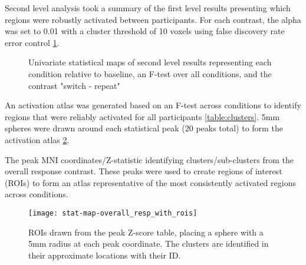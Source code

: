 \documentclass[10pt,letterpaper]{article}
\begin{document}
Second level analysis took a summary of the first level results presenting which
regions were robustly activated between participants.
For each contrast, the alpha was set to 0.01 with a cluster threshold of 10 voxels using
false discovery rate error control \ref{fig:stat_maps}.

\begin{figure}[H]
  \centering
\end{figure}

\begin{figure}[H]
  \ContinuedFloat
  \centering
\end{figure}

\begin{figure}[H]
  \ContinuedFloat
  \centering
\end{figure}

\begin{figure}[H]
  \ContinuedFloat
  \centering
  \caption{
    Univariate statistical maps of second level results representing
    each condition relative to baseline, an F-test over all conditions,
    and the contrast "switch - repeat"}
  \label{fig:stat_maps}
\end{figure}

An activation atlas was generated based on an F-test across conditions
to identify regions that were reliably activated for all participants \ref{table:clusters}.
5mm spheres were drawn around each statistical peak (20 peaks total)
to form the activation atlas \ref{fig:methroimap}.

\begin{table}[H]
  \caption{
    The peak MNI coordinates/Z-statistic identifying clusters/sub-clusters from the overall
    response contrast.
    These peaks were used to create regions of interest (ROIs) to form an atlas representative
    of the most consistently activated regions across conditions.
  }
  \label{table:clusters}
\end{table}


\begin{figure}[H]
  \centering
  \texttt{[image: stat-map-overall\_resp\_with\_rois]}
  \caption{
    ROIs drawn from the peak Z-score table, placing a sphere with a 5mm radius
    at each peak coordinate.
    The clusters are identified in their approximate locations
    with their ID.
  }
  \label{fig:methroimap}
\end{figure}
\end{document}
